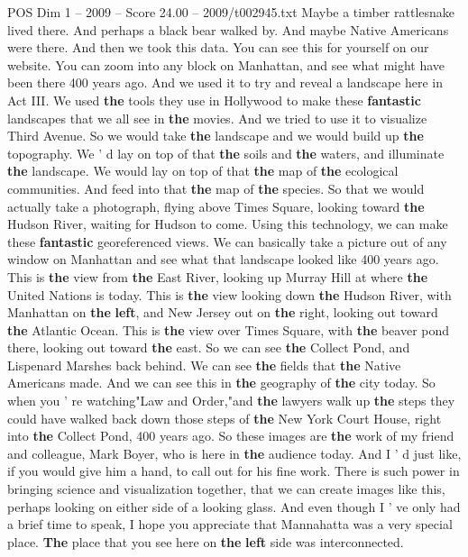 \begin{textsample}{POS Dim 1 – 2009 – Score 24.00 – 2009/t002945.txt}
Maybe a timber rattlesnake lived there.
And perhaps a black bear walked by.
And maybe Native Americans were there.
And then we took this data.
You can see this for yourself on our website.
You can zoom into any block on Manhattan, and see what might have been there 400 years ago.
And we used it to try and reveal a landscape here in Act III.
We used \textbf{the} tools they use in Hollywood to make these \textbf{fantastic} landscapes that we all see in \textbf{the} movies.
And we tried to use it to visualize Third Avenue.
So we would take \textbf{the} landscape and we would build up \textbf{the} topography.
We ' d lay on top of that \textbf{the} soils and \textbf{the} waters, and illuminate \textbf{the} landscape.
We would lay on top of that \textbf{the} map of \textbf{the} ecological communities.
And feed into that \textbf{the} map of \textbf{the} species.
So that we would actually take a photograph, flying above Times Square, looking toward \textbf{the} Hudson River, waiting for Hudson to come.
Using this technology, we can make these \textbf{fantastic} georeferenced views.
We can basically take a picture out of any window on Manhattan and see what that landscape looked like 400 years ago.
This is \textbf{the} view from \textbf{the} East River, looking up Murray Hill at where \textbf{the} United Nations is today.
This is \textbf{the} view looking down \textbf{the} Hudson River, with Manhattan on \textbf{the} \textbf{left}, and New Jersey out on \textbf{the} right, looking out toward \textbf{the} Atlantic Ocean.
This is \textbf{the} view over Times Square, with \textbf{the} beaver pond there, looking out toward \textbf{the} east.
So we can see \textbf{the} Collect Pond, and Lispenard Marshes back behind.
We can see \textbf{the} fields that \textbf{the} Native Americans made.
And we can see this in \textbf{the} geography of \textbf{the} city today.
So when you ' re watching"Law and Order,"and \textbf{the} lawyers walk up \textbf{the} steps they could have walked back down those steps of \textbf{the} New York Court House, right into \textbf{the} Collect Pond, 400 years ago.
So these images are \textbf{the} work of my friend and colleague, Mark Boyer, who is here in \textbf{the} audience today.
And I ' d just like, if you would give him a hand, to call out for his fine work.
There is such power in bringing science and visualization together, that we can create images like this, perhaps looking on either side of a looking glass.
And even though I ' ve only had a brief time to speak, I hope you appreciate that Mannahatta was a very special place. \textbf{The} place that you see here on \textbf{the} \textbf{left} side was interconnected.

\end{textsample}
